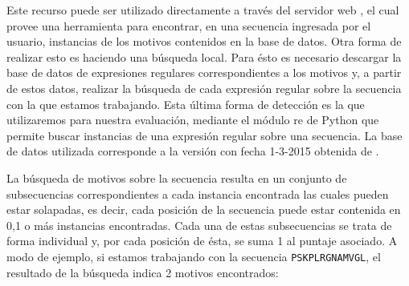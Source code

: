 

Este recurso puede ser utilizado directamente a través del servidor web \cite{elmweb}, el cual provee una herramienta para encontrar, en una secuencia ingresada por el usuario, instancias de los motivos contenidos en la base de datos.
Otra forma de realizar esto es haciendo una búsqueda local. Para ésto es necesario descargar la base de datos de expresiones regulares correspondientes a los motivos y, 
a partir de estos datos, realizar la búsqueda de cada expresión regular sobre la secuencia con la que estamos trabajando.
Esta última forma de detección es la que utilizaremos para nuestra evaluación, mediante el módulo re de Python que permite buscar instancias de una expresión regular sobre una secuencia.
La base de datos utilizada corresponde a la versión con fecha 1-3-2015 obtenida de \cite{elmweb}.

La búsqueda de motivos sobre la secuencia resulta en un conjunto de subsecuencias correspondientes a cada instancia encontrada las cuales pueden estar solapadas, es decir, 
cada posición de la secuencia puede estar contenida en 0,1 o más instancias encontradas. 
Cada una de estas subsecuencias se trata de forma individual y, por cada posición de ésta, se suma 1 al puntaje asociado.
A modo de ejemplo, si estamos trabajando con la secuencia \texttt{PSKPLRGNAMVGL}, el resultado de la búsqueda indica 2 motivos encontrados:
% 
\vspace{0.5cm}

